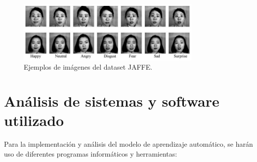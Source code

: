 \documentclass[12pt]{report} %
\begin{document}
\begin{figure}[H]
	\centering
	\includegraphics[width=0.8\textwidth]{jaffeExamples.jpg}
	\caption{Ejemplos de imágenes del dataset JAFFE.}
	\label{fig:imagen35}
\end{figure}

\section{Análisis de sistemas y software utilizado}

Para la implementación y análisis del modelo de aprendizaje automático, se harán uso de diferentes programas informáticos y herramientas:
\end{document}
